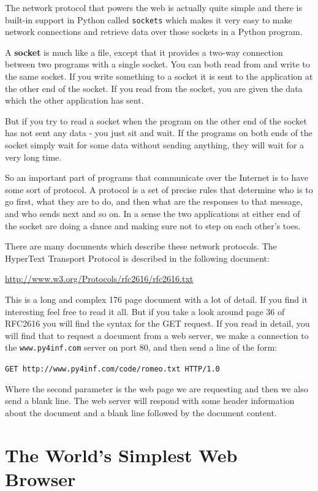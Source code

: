 \documentclass[11pt]{book}
\begin{document}
The network protocol that powers the web is actually quite simple and 
there is built-in support in Python called {\tt sockets} which makes it very 
easy to make network connections and retrieve data over those
sockets in a Python program.

A {\bf socket} is much like a file, except that it 
provides a two-way connection between two 
programs with a single socket.  
You can both read from and write to the same socket.  If you write something to 
a socket it is sent to the application at the other end of the socket.  If you 
read from the socket, you are given the data which the other application has sent.

But if you try to read a socket when the program on the other end of the socket
has not sent any data - you just sit and wait.  If the programs on both ends
of the socket simply wait for some data without sending anything, they will wait for
a very long time.

So an important part of programs that communicate over the Internet is to have some
sort of protocol.   A protocol is a set of precise rules that determine who
is to go first, what they are to do, and then what are the responses to that message,
and who sends next and so on.  In a sense the two applications at either end 
of the socket are doing a dance and making sure not to step on each other's toes.

There are many documents which describe these network protocols.  The HyperText Transport 
Protocol is described in the following document:

\url{http://www.w3.org/Protocols/rfc2616/rfc2616.txt}

This is a long and complex 176 page document with a lot of detail.  If you 
find it interesting feel free to read it all.  But if you take a look around page 36 of
RFC2616 you will find the syntax for the GET request.  If you read in detail, you will
find that to request a document from a web server, we make a connection to 
the {\tt www.py4inf.com} server on port 80, and then send a line of the form:

{\tt GET http://www.py4inf.com/code/romeo.txt HTTP/1.0 }

Where the second parameter is the web page we are requesting and then 
we also send a blank line.  The web server will respond with some 
header information about the document and a blank line
followed by the document content.

\section{The World's Simplest Web Browser}
\end{document}

